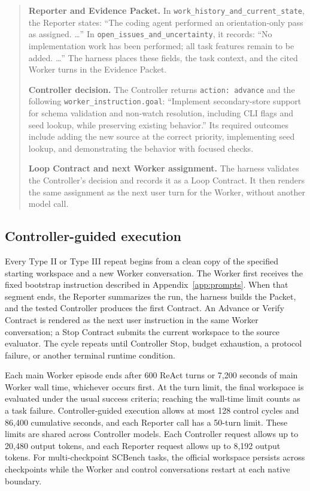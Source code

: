 \begin{quote}\small
\textbf{Reporter and Evidence Packet.}
In \texttt{work\_history\_and\_current\_state}, the Reporter states: ``The coding agent performed an orientation-only pass as assigned. \ldots'' In \texttt{open\_issues\_and\_uncertainty}, it records: ``No implementation work has been performed; all task features remain to be added. \ldots'' The harness places these fields, the task context, and the cited Worker turns in the Evidence Packet.

\textbf{Controller decision.}
The Controller returns \texttt{action: advance} and the following \texttt{worker\_instruction.goal}: ``Implement secondary-store support for schema validation and non-watch resolution, including CLI flags and seed lookup, while preserving existing behavior.'' Its required outcomes include adding the new source at the correct priority, implementing seed lookup, and demonstrating the behavior with focused checks.

\textbf{Loop Contract and next Worker assignment.}
The harness validates the Controller's decision and records it as a Loop Contract. It then renders the same assignment as the next user turn for the Worker, without another model call.
\end{quote}

\subsection{Controller-guided execution}

Every Type II or Type III repeat begins from a clean copy of the specified starting workspace and a new Worker conversation. The Worker first receives the fixed bootstrap instruction described in Appendix~\ref{app:prompts}. When that segment ends, the Reporter summarizes the run, the harness builds the Packet, and the tested Controller produces the first Contract. An Advance or Verify Contract is rendered as the next user instruction in the same Worker conversation; a Stop Contract submits the current workspace to the source evaluator. The cycle repeats until Controller Stop, budget exhaustion, a protocol failure, or another terminal runtime condition.

Each main Worker episode ends after 600 ReAct turns or 7,200 seconds of main Worker wall time, whichever occurs first. At the turn limit, the final workspace is evaluated under the usual success criteria; reaching the wall-time limit counts as a task failure. Controller-guided execution allows at most 128 control cycles and 86,400 cumulative seconds, and each Reporter call has a 50-turn limit. These limits are shared across Controller models. Each Controller request allows up to 20,480 output tokens, and each Reporter request allows up to 8,192 output tokens. For multi-checkpoint SCBench tasks, the official workspace persists across checkpoints while the Worker and control conversations restart at each native boundary.

